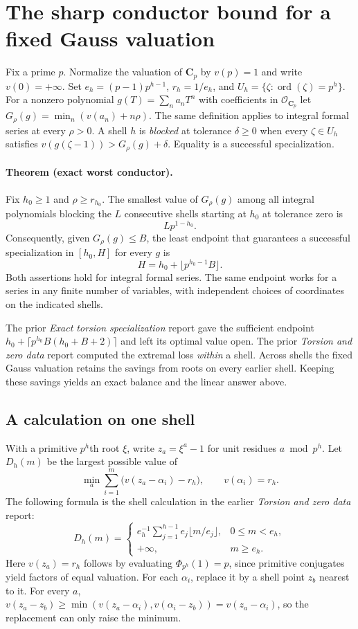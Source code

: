 \section{The sharp conductor bound for a fixed Gauss valuation}
\label{sec:fixed-radius}

Fix a prime $p$. Normalize the valuation of $\mathbf C_p$ by $v(p)=1$ and
write $v(0)=+\infty$. Set $e_h=(p-1)p^{h-1}$, $r_h=1/e_h$, and
$U_h=\{\zeta:\operatorname{ord}(\zeta)=p^h\}$. For a nonzero polynomial
$g(T)=\sum_n a_nT^n$ with coefficients in $\mathcal O_{\mathbf C_p}$ let
$G_\rho(g)=\min_n(v(a_n)+n\rho)$. The same definition applies to integral
formal series at every $\rho>0$. A shell $h$ is \emph{blocked} at tolerance
$\delta\ge0$ when every $\zeta\in U_h$ satisfies
$v(g(\zeta-1))>G_\rho(g)+\delta$. Equality is a successful specialization.

\paragraph{Theorem (exact worst conductor).}
Fix $h_0\ge1$ and $\rho\ge r_{h_0}$. The smallest value of $G_\rho(g)$
among all integral polynomials blocking the $L$ consecutive shells starting
at $h_0$ at tolerance zero is
\[
                        Lp^{1-h_0}.
\]
Consequently, given $G_\rho(g)\le B$, the least endpoint that guarantees
a successful specialization in $[h_0,H]$ for every $g$ is
\[
                 \boxed{H=h_0+\lfloor p^{h_0-1}B\rfloor.}
\]
Both assertions hold for integral formal series. The same endpoint works
for a series in any finite number of variables, with independent choices
of coordinates on the indicated shells.

The prior \emph{Exact torsion specialization} report gave the sufficient
endpoint $h_0+\lceil p^{h_0}B(h_0+B+2)\rceil$ and left its optimal value
open. The prior \emph{Torsion and zero data} report computed the extremal
loss \emph{within} a shell. Across shells the fixed Gauss valuation
retains the savings from roots on every earlier shell. Keeping these
savings yields an exact balance and the linear answer above.

\subsection{A calculation on one shell}
With a primitive $p^h$th root $\xi$, write $z_a=\xi^a-1$ for unit
residues $a\bmod p^h$. Let $D_h(m)$ be the largest possible value of
\[
   \min_a \sum_{i=1}^m \big(v(z_a-\alpha_i)-r_h\big),
        \qquad v(\alpha_i)=r_h.
\]
The following formula is the shell calculation in the earlier
\emph{Torsion and zero data} report:
\[
 D_h(m)=
 \begin{cases}
  e_h^{-1}\displaystyle\sum_{j=1}^{h-1}e_j\lfloor m/e_j\rfloor,
                    &0\le m<e_h,\\
  +\infty,&m\ge e_h.
 \end{cases}
\]
Here $v(z_a)=r_h$ follows by evaluating $\Phi_{p^h}(1)=p$, since
primitive conjugates yield factors of equal valuation. For each $\alpha_i$,
replace it by a shell point $z_b$ nearest to it. For every $a$,
$v(z_a-z_b)\ge\min(v(z_a-\alpha_i),v(\alpha_i-z_b))
=v(z_a-\alpha_i)$, so the replacement can only raise the minimum.

